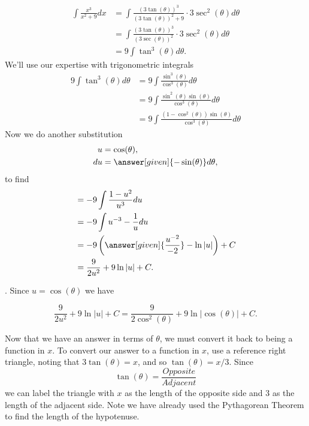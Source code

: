 \documentclass{ximera}
\begin{document}
\begin{example}
\begin{explanation}
    \begin{align*}
      \int \frac{x^3}{x^2+9} dx &= \int \frac{(3\tan(\theta))^3}{(3\tan(\theta))^2+9} \cdot 3\sec^2(\theta) d\theta\\
      &=\int \frac{(3\tan(\theta))^3}{(3\sec(\theta))^2} \cdot 3\sec^2(\theta) d\theta\\
      &=9\int \tan^3(\theta)  d\theta.
    \end{align*}
    We'll use our expertise with trigonometric integrals
    \begin{align*}
      9\int \tan^3(\theta)  d\theta &= 9\int \frac{\sin^3(\theta)}{\cos^{3}(\theta)}  d\theta\\
      &= 9\int \frac{\sin^2(\theta) \sin(\theta)}{\cos^{3}(\theta)}  d\theta\\
      &= 9\int \frac{(1-\cos^2(\theta)) \sin(\theta)}{\cos^{3}(\theta)}   d\theta
    \end{align*}
    Now we do another substitution
    \begin{align*}
      u&=\cos(\theta),\\
      du &= \answer[given]{-\sin(\theta)}d\theta,
    \end{align*}
    to find
    \begin{align*}
      &= -9\int \frac{1-u^2}{u^3}du\\
      &= -9\int u^{-3}-\frac{1}{u}du\\
      &= -9\left(\answer[given]{\frac{u^{-2}}{-2}}-\ln|u|\right) + C\\
      &= \frac{9}{2u^2} + 9\ln|u| + C.
    \end{align*}

. Since $u = \cos(\theta)$ we have

    \[
    \frac{9}{2u^2} + 9\ln|u| + C = \frac{9}{2\cos^2(\theta)} + 9\ln|\cos(\theta)| + C.
    \]

    Now that we have an answer in terms of $\theta$, we must convert it back to
    being a function in $x$.
    To convert our answer to a function in $x$, use a reference right
    triangle, noting that $3\tan(\theta) = x$, and so $\tan(\theta) =
    x/3$. 
Since 
\[
\tan(\theta)=\frac{Opposite}{Adjacent}
\] 
we can label the triangle with $x$ as the length of the opposite side and $3$ as the length of the adjacent side. Note we have already used the Pythagorean Theorem to 
find the length of the hypotenuse. 


\end{explanation}
\end{example}
\end{document}
